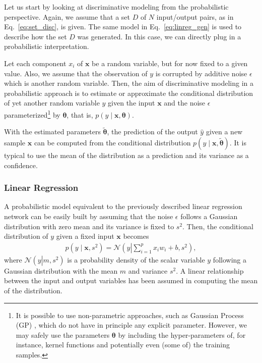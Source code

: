 \documentclass[dissertation,nocontribution,draft*]{aaltoseries}
\newcommand{\vect}[1]{\mathbf{#1}}
\newcommand{\vects}[1]{\boldsymbol{#1}}
\newcommand{\vx}[0]{\vect{x}}
\newcommand{\TT}[0]{{\vects{\theta}}}
\newcommand{\NN}[0]{\mathcal{N}}
\begin{document}
Let us start by looking at discriminative modeling from
the probabilistic perspective. Again, we assume that a set
$D$ of $N$ input/output pairs, as in
Eq.~\eqref{eq:set_disc}, is given. The same model in
Eq.~\eqref{eq:linreg_gen} is used to describe how the set
$D$ was generated. In this case, we can directly plug in a
probabilistic interpretation.

Let each component $x_i$ of $\vx$ be a random variable, but
for now fixed to a given value. Also, we assume that the
observation of $y$ is corrupted by additive noise
$\epsilon$ which is another random variable.
Then, the aim of
discriminative modeling in a probabilistic approach is to
estimate or approximate the conditional distribution of
yet another random variable $y$ given the input $\vx$ and
the noise $\epsilon$ parameterized\footnote{It is
possible to use non-parametric approaches, such as Gaussian
Process (GP) \citep[see, e.g.,][]{Rasmussen2006}, which do
not have in principle any explicit parameter. However, we may safely
use the parameters $\TT$ by including the hyper-parameters
of, for instance, kernel functions and potentially even
(some of) the training samples.} by $\TT$, that is, ${p(y \mid \vx,
\TT)}$.

With the estimated parameters $\tilde{\TT}$, the prediction
of the output $\hat{y}$ given a new sample $\vx$ can be
computed from the conditional distribution $p(y \mid
\vx, \tilde{\TT})$. It is typical to use the mean of the
distribution as a prediction and its variance as a
confidence.

\subsubsection{Linear Regression}

A probabilistic model equivalent to the previously described
linear regression network can be easily built by assuming
that the noise
$\epsilon$ follows a Gaussian distribution with zero mean
and its variance is fixed to $s^2$. Then, the conditional
distribution of $y$ given a fixed input $\vx$ becomes
\begin{align*}
    p(y \mid \vx, s^2) = \NN \left( y \left| \sum_{i=1}^p
    x_i w_i + b, s^2\right.\right),
\end{align*}
where $\NN \left( y \left| m, s^2\right.\right)$ is a
probability density of the scalar variable $y$ following a Gaussian distribution
with the mean $m$ and variance $s^2$. A linear relationship
between the input and output variables has been assumed in
computing the mean of the distribution.
\end{document}
